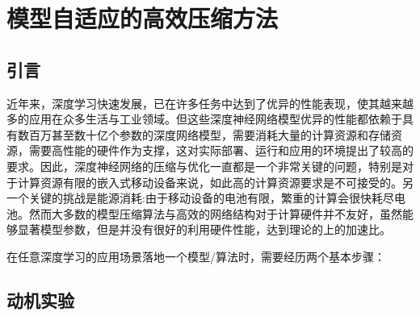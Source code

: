 
\chapter{模型自适应的高效压缩方法}

\section{引言}

近年来，深度学习快速发展，已在许多任务中达到了优异的性能表现，使其越来越多的应用在众多生活与工业领域。但这些深度神经网络模型优异的性能都依赖于具有数百万甚至数十亿个参数的深度网络模型，需要消耗大量的计算资源和存储资源，需要高性能的硬件作为支撑，这对实际部署、运行和应用的环境提出了较高的要求。因此，深度神经网络的压缩与优化一直都是一个非常关键的问题，特别是对于计算资源有限的嵌入式移动设备来说，如此高的计算资源要求是不可接受的。另一个关键的挑战是能源消耗:由于移动设备的电池有限，繁重的计算会很快耗尽电池。然而大多数的模型压缩算法与高效的网络结构对于计算硬件并不友好，虽然能够显著模型参数，但是并没有很好的利用硬件性能，达到理论的上的加速比。

在任意深度学习的应用场景落地一个模型/算法时，需要经历两个基本步骤：
\section{动机实验}
